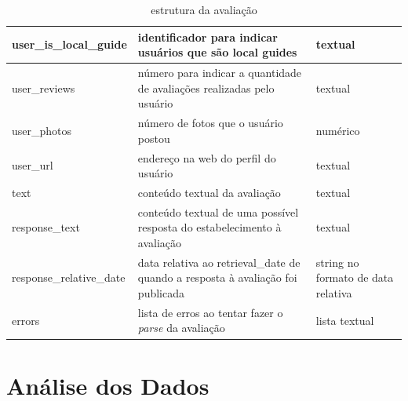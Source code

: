 \begin{table}[]
\begin{tabular}{|l|p{5cm}|p{5cm}|}
		\hline
		user\_is\_local\_guide    & identificador para indicar usuários que são local guides                        & textual                                                                        \\
		\hline
		user\_reviews             & número para indicar a quantidade de avaliações realizadas pelo usuário         & textual                                                                        \\
		\hline
		user\_photos              & número de fotos que o usuário postou                                            & numérico                                                                       \\
		\hline
		user\_url                 & endereço na web do perfil do usuário                                            & textual                                                                        \\
		\hline
		text                      & conteúdo textual da avaliação                                                    & textual                                                                        \\
		\hline
		response\_text            & conteúdo textual de uma possível resposta do estabelecimento à avaliação         & textual                                                                        \\
		\hline
		response\_relative\_date  & data relativa ao retrieval\_date de quando a resposta à avaliação foi publicada & string no formato de data relativa                                             \\
		\hline
		errors                    & lista de erros ao tentar fazer o \emph{parse} da avaliação                      & lista textual                                                                  \\
		\hline
	\end{tabular}
	\caption{estrutura da avaliação}
	\label{tab:estrutura_review}
\end{table}
\section{Análise dos Dados}
\label{cap:metodologia:sec:analise_dados}





